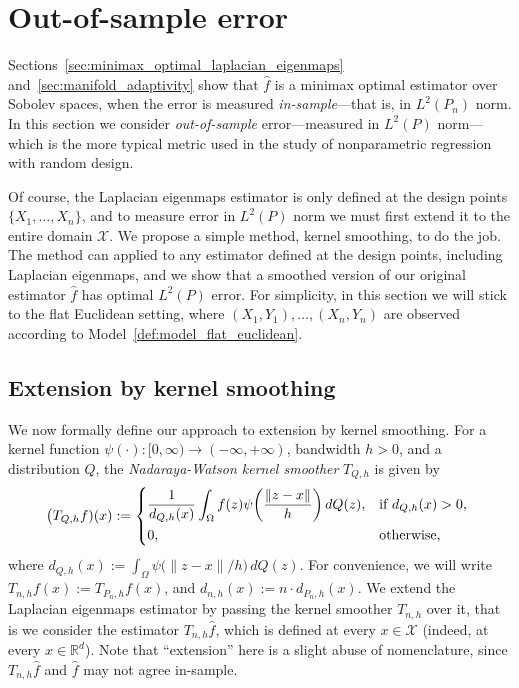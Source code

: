 \documentclass[aos]{imsart}
\theoremstyle{plain}
\theoremstyle{definition}
\theoremstyle{remark}
\def\R{\mathbb{R}}
\newcommand{\wh}[1]{\widehat{#1}}
\newcommand{\mc}[1]{\mathcal{#1}}
\newcommand{\Reals}{\mathbb{R}} %
\newcommand{\Rd}{\Reals^d}
\newcommand{\1}{\mathbf{1}}
\begin{document}
\section{Out-of-sample error}
\label{sec:out_of_sample}
Sections~\ref{sec:minimax_optimal_laplacian_eigenmaps} and~\ref{sec:manifold_adaptivity} show that $\wh{f}$ is a minimax optimal estimator over Sobolev spaces, when the error is measured \emph{in-sample}---that is, in $L^2(P_n)$ norm. In this section we consider \emph{out-of-sample} error---measured in $L^2(P)$ norm---which is the more typical metric used in the study of nonparametric regression with random design. 

Of course, the Laplacian eigenmaps estimator is only defined at the design points $\{X_1,\ldots,X_n\}$, and to measure error in $L^2(P)$ norm we must first extend it to the entire domain $\mc{X}$. We propose a simple method, kernel smoothing, to do the job. The method can applied to any estimator defined at the design points, including Laplacian eigenmaps, and we show that a smoothed version of our original estimator $\wh{f}$ has optimal $L^2(P)$ error. For simplicity, in this section we will stick to the flat Euclidean setting, where $(X_1,Y_1),\ldots,(X_n,Y_n)$ are observed according to Model~\ref{def:model_flat_euclidean}.

\subsection{Extension by kernel smoothing}
We now formally define our approach to extension by kernel smoothing. For a kernel function $\psi(\cdot): [0,\infty) \to (-\infty,+\infty)$, bandwidth $h > 0$, and a distribution $Q$, the \emph{Nadaraya-Watson kernel smoother} $T_{Q,h}$ is given by
\begin{equation*}
\bigl(T_{Q,h}f)(x) := 
\begin{dcases*}
\frac{1}{d_{Q,h}(x)} \int_{\Omega} f(z)\psi\biggl(\frac{\|z - x\|}{h}\biggr) \,dQ(z), & \textrm{if $d_{Q,h}(x) > 0$,} \\
0, &\textrm{otherwise,}
\end{dcases*}
\end{equation*}
where $d_{Q,h}(x) := \int_{\Omega} \psi\bigl(\|z - x\|/h\bigr) \,dQ(z)$. For convenience, we will write $T_{n,h}f(x) := T_{P_n,h}f(x)$, and $d_{n,h}(x) := n \cdot d_{P_n,h}(x)$.  We extend the Laplacian eigenmaps estimator by passing the kernel smoother $T_{n,h}$ over it, that is we consider the estimator $T_{n,h}\wh{f}$, which is defined at every $x \in \mc{X}$ (indeed, at every $x \in \Rd$). Note that ``extension'' here is a slight abuse of nomenclature, since $T_{n,h}\wh{f}$ and $\wh{f}$ may not agree in-sample.
\end{document}

